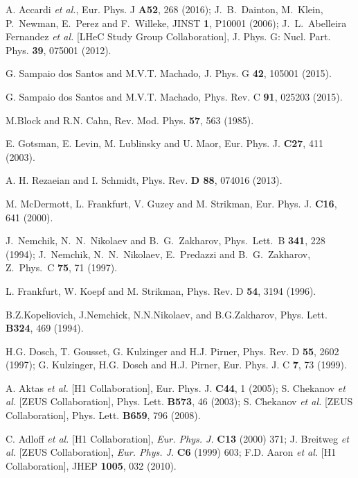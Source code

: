 \documentclass[twocolumn,showpacs,preprintnumbers,amsmath,amssymb,showkeys,aps,prd,a4paper,byrevtex]{revtex4}
\begin{document}
\begin{thebibliography}{99}
 A. Accardi {\it et al.}, Eur. Phys. J {\bf A52}, 268 (2016);  J.~B.~Dainton, M.~Klein, P.~Newman, E.~Perez and F.~Willeke,
  JINST {\bf 1}, P10001 (2006); J.~L.~Abelleira Fernandez {\it et al.}  [LHeC Study Group Collaboration], J. Phys. G: Nucl. Part. Phys. {\bf 39}, 075001 (2012).

  G. Sampaio dos Santos and M.V.T. Machado, J. Phys. G {\bf 42}, 105001 (2015).

 G. Sampaio dos Santos and M.V.T. Machado, Phys. Rev. C {\bf 91}, 025203 (2015).

 M.Block and R.N. Cahn, Rev. Mod. Phys. {\bf 57}, 563 (1985).

 E. Gotsman, E. Levin, M. Lublinsky and U. Maor, 	Eur. Phys. J. {\bf C27}, 411 (2003).

 A. H. Rezaeian and I. Schmidt,  Phys. Rev.  {\bf D 88}, 074016 (2013).

 M. McDermott, L. Frankfurt, V. Guzey and M. Strikman, Eur. Phys. J. {\bf C16}, 641 (2000).

J.~Nemchik, N.~N.~Nikolaev and B.~G.~Zakharov,
Phys.\ Lett.\ B {\bf 341}, 228 (1994); J.~Nemchik, N.~N.~Nikolaev, E.~Predazzi and B.~G.~Zakharov,
Z.\ Phys.\ C {\bf 75}, 71 (1997).

L. Frankfurt, W. Koepf and M. Strikman, Phys. Rev. D {\bf 54}, 3194 (1996). 

 B.Z.Kopeliovich, J.Nemchick, N.N.Nikolaev, and B.G.Zakharov, 	Phys. Lett. {\bf B324}, 469 (1994).

H.G. Dosch, T. Gousset, G. Kulzinger and H.J. Pirner, Phys. Rev. D {\bf 55}, 2602 (1997); G. Kulzinger, H.G. Dosch and H.J. Pirner, Eur. Phys. J. C {\bf 7}, 73  (1999).



A. Aktas {\it et al.} [H1 Collaboration], Eur. Phys. J.  {\bf C44}, 1 (2005); S. Chekanov {\it et al.} [ZEUS Collaboration], Phys. Lett. {\bf B573}, 46
(2003); S. Chekanov {\it et al.} [ZEUS Collaboration],  Phys. Lett. {\bf B659}, 796 (2008). 

C. Adloff {\it et al.} [H1 Collaboration], {\it Eur. Phys. J.} {\bf C13} (2000) 
371; J. Breitweg {\it et al.} [ZEUS Collaboration], {\it Eur. Phys. J.}
{\bf C6} (1999) 603; F.D.  Aaron {\it et al.} [H1 Collaboration], JHEP  {\bf 1005}, 032 (2010).


\end{thebibliography}
\end{document}

